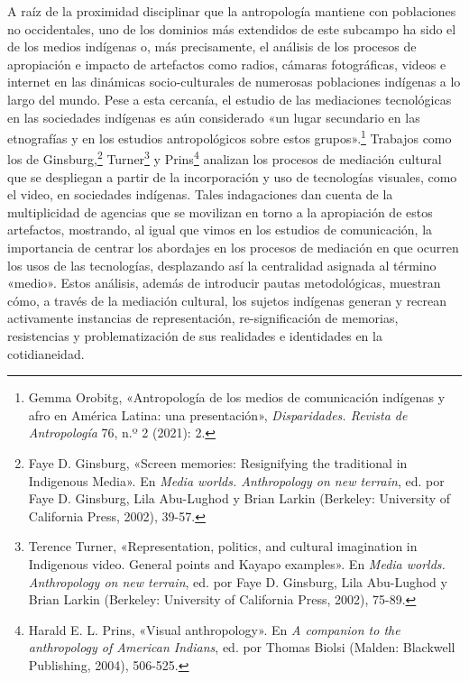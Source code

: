 \documentclass{tufte-handout}
\begin{document}
A raíz de la proximidad disciplinar que la antropología mantiene con
poblaciones no occidentales, uno de los dominios más extendidos de este
subcampo ha sido el de los medios indígenas o, más precisamente, el
análisis de los procesos de apropiación e impacto de artefactos como
radios, cámaras fotográficas, videos e internet en las dinámicas
socio-culturales de numerosas poblaciones indígenas a lo largo del
mundo. Pese a esta cercanía, el estudio de las mediaciones tecnológicas
en las sociedades indígenas es aún considerado «un lugar secundario en
las etnografías y en los estudios antropológicos sobre estos
grupos».\footnote{Gemma Orobitg, «Antropología de los medios de
  comunicación indígenas y afro en América Latina: una presentación»,
  \emph{Disparidades. Revista de Antropología} 76, n.º 2 (2021): 2.}
Trabajos como los de Ginsburg,\footnote{Faye D. Ginsburg, «Screen
  memories: Resignifying the traditional in Indigenous Media». En
  \emph{Media worlds. Anthropology on new terrain}, ed. por Faye D.
  Ginsburg, Lila Abu-Lughod y Brian Larkin (Berkeley: University of
  California Press, 2002), 39-57.} Turner\footnote{Terence Turner,
  «Representation, politics, and cultural imagination in Indigenous
  video. General points and Kayapo examples». En \emph{Media worlds.
  Anthropology on new terrain}, ed. por Faye D. Ginsburg, Lila
  Abu-Lughod y Brian Larkin (Berkeley: University of California Press,
  2002), 75-89.} y Prins\footnote{Harald E. L. Prins, «Visual
  anthropology». En \emph{A companion to the anthropology of American
  Indians}, ed. por Thomas Biolsi (Malden: Blackwell Publishing, 2004),
  506-525.} analizan los procesos de mediación cultural que se
despliegan a partir de la incorporación y uso de tecnologías visuales,
como el video, en sociedades indígenas. Tales indagaciones dan cuenta de
la multiplicidad de agencias que se movilizan en torno a la apropiación
de estos artefactos, mostrando, al igual que vimos en los estudios de
comunicación, la importancia de centrar los abordajes en los procesos de
mediación en que ocurren los usos de las tecnologías, desplazando así la
centralidad asignada al término «medio». Estos análisis, además de
introducir pautas metodológicas, muestran cómo, a través de la mediación
cultural, los sujetos indígenas generan y recrean activamente instancias
de representación, re-significación de memorias, resistencias y
problematización de sus realidades e identidades en la cotidianeidad.
\end{document}
